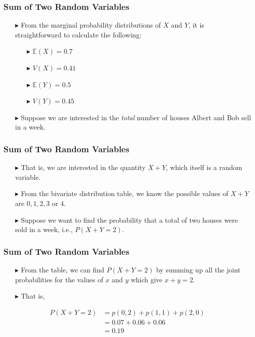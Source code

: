 \documentclass[12pt]{beamer}
\newcommand{\E}{\mathbb{E}}
\begin{document}
\begin{frame}
	\frametitle{Sum of Two Random Variables}
	
	\begin{itemize}
		\item[\color{blue}$\blacktriangleright$] From the marginal probability distributions of $X$ and $Y$, it is straightforward to calculate the following:
		\begin{itemize}
			\item[\color{blue}$\blacktriangleright$] $\E(X) = 0.7$
			\item[\color{blue}$\blacktriangleright$] $V(X) = 0.41$
			\item[\color{blue}$\blacktriangleright$] $\E(Y) = 0.5$
			\item[\color{blue}$\blacktriangleright$] $V(Y) = 0.45$
		\end{itemize}
		\item[\color{blue}$\blacktriangleright$] Suppose we are interested in the \emph{total} number of houses Albert and Bob sell in a week.
	\end{itemize}
	
\end{frame}
\begin{frame}
	\frametitle{Sum of Two Random Variables}
	
	\begin{itemize}
		\item[\color{blue}$\blacktriangleright$] That is, we are interested in the quantity $X + Y$, which itself is a random variable.
		
		\item[\color{blue}$\blacktriangleright$] From the bivariate distribution table, we know the possible values of $X + Y$ are $0, 1, 2, 3$ or $4$.
		
		\item[\color{blue}$\blacktriangleright$] Suppose we want to find the probability that a total of two houses were sold in a week, i.e., 
		$P(X + Y = 2)$.
	\end{itemize}
	
\end{frame}
\begin{frame}
	\frametitle{Sum of Two Random Variables}
	
	\begin{itemize}
		\item[\color{blue}$\blacktriangleright$] From the table, we can find $P(X + Y = 2)$ by summing up all the joint probabilities for the values of $x$ and $y$ which give $x + y = 2$.
		\item[\color{blue}$\blacktriangleright$] That is,
	\end{itemize}
	
	\vspace{0.5cm}
	
	\begin{align*}
		P(X + Y = 2) &= p(0, 2) + p(1, 1) + p(2, 0) \\
		&= 0.07 + 0.06 + 0.06 \\
		&= 0.19\\
	\end{align*}
	
\end{frame}
\end{document}
